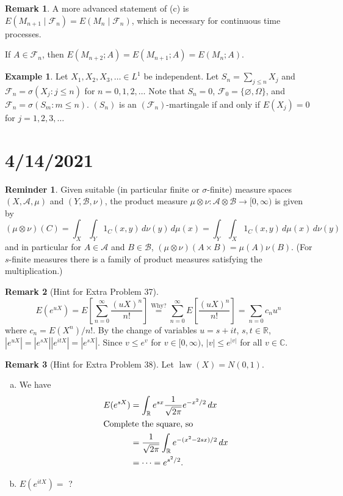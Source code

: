 \documentclass{article}
\DeclareMathOperator{\law}{law}
\newcommand{\C}{\mathbb{C}}
\newcommand{\R}{\mathbb{R}}
\newcommand{\F}{\mathscr{F}}
\theoremstyle{definition}
\newtheorem*{example}{Example}
\newtheorem*{reminder}{Reminder}
\newtheorem*{remark}{Remark}
\begin{document}
\begin{remark}
A more advanced statement of (c) is $E(M_{n+1} \mid \F_n) = E(M_n \mid \F_n)$, which is necessary for continuous time processes.

If $A \in \F_n$, then $E(M_{n+2} ; A) = E(M_{n+1} ; A) = E(M_n ; A)$.
\end{remark}

\begin{example}
Let $X_1, X_2, X_3, \dots \in L^1$ be independent. Let $S_n = \sum_{j \leq n} X_j$ and $\F_n = \sigma(X_j : j \leq n)$ for $n = 0, 1, 2, \dots$ Note that $S_n = 0$, $\F_0 = \{\varnothing, \Omega\}$, and $\F_n = \sigma(S_m : m \leq n)$. $(S_n)$ is an $(\F_n)$-martingale if and only if $E(X_j) = 0$ for $j = 1, 2, 3, \dots$
\end{example}

\section*{4/14/2021}

\begin{reminder}
Given suitable (in particular finite or $\sigma$-finite) measure spaces $(X, \mathscr{A}, \mu)$ and $(Y, \mathscr{B}, \nu)$, the product measure $\mu \otimes \nu : \mathscr{A} \otimes \mathscr{B} \to [0, \infty)$ is given by
\[
    (\mu \otimes \nu)(C) = \int_X \int_Y 1_C(x,y) \,d\nu(y)\,d\mu(x) = \int_Y \int_X 1_C(x,y)\,d\mu(x)\,d\nu(y)
\]
and in particular for $A \in \mathscr{A}$ and $B \in \mathscr{B}$, $(\mu \otimes \nu)(A \times B) = \mu(A)\nu(B)$. (For $s$-finite measures there is a family of product measures satisfying the multiplication.)
\end{reminder}

\begin{remark}[Hint for Extra Problem 37]
\[
    E(e^{uX}) = E\left[\sum_{n=0}^\infty \frac{(uX)^n}{n!}\right] \overset{\text{Why?}}{=} \sum_{n=0}^\infty E\left[\frac{(uX)^n}{n!}\right] = \sum_{n=0} c_nu^n
\]
where $c_n = E(X^n)/n!$. By the change of variables $u = s + it$, $s, t \in \R$, $|e^{uX}| = |e^{sX}||e^{itX}| = |e^{sX}|$. Since $v \leq e^v$ for $v \in [0, \infty)$, $|v| \leq e^{|v|}$ for all $v \in \C$.
\end{remark}
\begin{remark}[Hint for Extra Problem 38]
Let $\law(X) = N(0,1)$.
\begin{enumerate}[(a)]
    \item We have
    \begin{align*}
        E(e^{sX}) &= \int_\R e^{sx} \frac{1}{\sqrt{2\pi}} e^{-x^2/2} \,dx \\
        \intertext{Complete the square, so}
        &= \frac{1}{\sqrt{2\pi}} \int_\R e^{-(x^2 - 2sx)/2} \,dx \\
        &= \cdots = e^{s^2/2}.
    \end{align*}
    \item $E(e^{itX}) =$ ?
\end{enumerate}
\end{remark}
\end{document}
